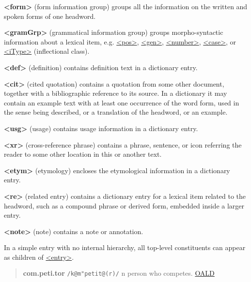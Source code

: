 \begin{sansreflist}
  
\item [\textbf{<form>}] (form information group) groups all the information on the written and spoken forms of one headword.
\item [\textbf{<gramGrp>}] (grammatical information group) groups morpho-syntactic information about a lexical item, e.g. \hyperref[TEI.pos]{<pos>}, \hyperref[TEI.gen]{<gen>}, \hyperref[TEI.number]{<number>}, \hyperref[TEI.case]{<case>}, or \hyperref[TEI.iType]{<iType>} (inflectional class).
\item [\textbf{<def>}] (definition) contains definition text in a dictionary entry.
\item [\textbf{<cit>}] (cited quotation) contains a quotation from some other document, together with a bibliographic reference to its source. In a dictionary it may contain an example text with at least one occurrence of the word form, used in the sense being described, or a translation of the headword, or an example.
\item [\textbf{<usg>}] (usage) contains usage information in a dictionary entry.
\item [\textbf{<xr>}] (cross-reference phrase) contains a phrase, sentence, or icon referring the reader to some other location in this or another text.
\item [\textbf{<etym>}] (etymology) encloses the etymological information in a dictionary entry.
\item [\textbf{<re>}] (related entry) contains a dictionary entry for a lexical item related to the headword, such as a compound phrase or derived form, embedded inside a larger entry.
\item [\textbf{<note>}] (note) contains a note or annotation.
\end{sansreflist}
\par
In a simple entry with no internal hierarchy, all top-level constituents can appear as children of \hyperref[TEI.entry]{<entry>}. 
\begin{quote}{\bfseries com.peti.tor} \texttt{/k@m"petit@(r)/} n person who competes. \hyperref[DIC-OALD]{OALD}\end{quote}
